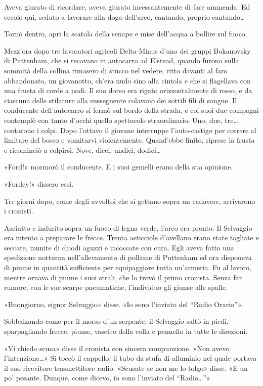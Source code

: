 \documentclass[
a5paper, %
10pt, %
twoside, 
onecolumn, %
openany, %
]{memoir}
\begin{document}
Aveva giurato di ricordare, aveva giurato incessantemente di fare ammenda. Ed eccolo qui, seduto a lavorare alla doga dell’arco, cantando, proprio cantando…

Tornò dentro, apri la scatola della senape e mise dell’acqua a bollire sul fuoco.

Mezz’ora dopo tre lavoratori agricoli Delta-Minus d’uno dei gruppi Bokanovsky di Puttenham, che si recavano in autocarro ad Elstead, quando furono sulla sommità della collina rimasero di stucco nel vedere, ritto davanti al faro abbandonato, un giovanotto, ch’era nudo sino alla cintola e che si flagellava con una frusta di corde a nodi. Il suo dorso era rigato orizzontalmente di rosso, e da ciascuna delle stilature alla susseguente colavano dei sottili fili di sangue. Il conducente dell’autocarro si fermò sul bordo della strada, e coi suoi due compagni contemplò con tanto d’occhi quello spettacolo straordinario. Uno, due, tre… contarono i colpi. Dopo l’ottavo il giovane interruppe l’auto-castigo per correre al limitare del bosco e vomitarvi violentemente. Quand’ebbe finito, riprese la frusta e ricominciò a colpirsi. Nove, dieci, undici, dodici…

«Ford!» mormorò il conducente. E i suoi gemelli erano della sua opinione.

«Fordey!» dissero essi.

Tre giorni dopo, come degli avvoltoi che si gettano sopra un cadavere, arrivarono i cronisti.

Asciutto e indurito sopra un fuoco di legna verde, l’arco era pronto. Il Selvaggio era intento a preparare le frecce. Trenta asticciole d’avellano erano state tagliate e seccate, munite di chiodi aguzzi e incoccate con cura. Egli aveva fatto una spedizione notturna nell’allevamento di pollame di Puttenham ed ora disponeva di piume in quantità sufficiente per equipaggiare tutta un’armeria. Fu al lavoro, mentre ornava di piume i suoi strali, che lo trovò il primo cronista. Senza far rumore, con le sue scarpe pneumatiche, l’individuo gli giunse alle spalle.

«Buongiorno, signor Selvaggio» disse. «Io sono l’inviato del “Radio Orario”».

Sobbalzando come per il morso d’un serpente, il Selvaggio saltò in piedi, sparpagliando frecce, piume, vasetto della colla e pennello in tutte le direzioni.

«Vi chiedo scusa» disse il cronista con sincera compunzione. «Non avevo l’intenzione…» Si toccò il cappello: il tubo da stufa di alluminio nel quale portava il suo ricevitore trasmettitore radio. «Scusate se non me lo tolgo» disse. «E un po’ pesante. Dunque, come dicevo, io sono l’inviato del “Radio…”»
\end{document}
